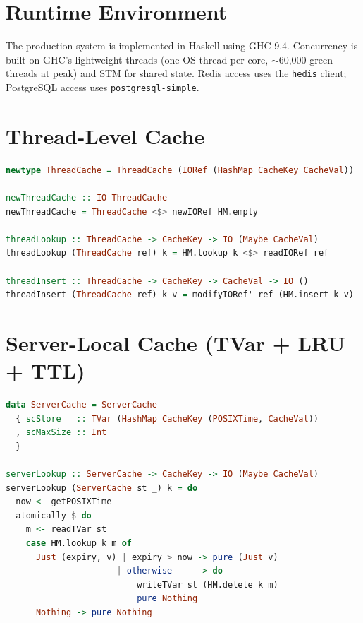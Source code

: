 \section{Runtime Environment}
The production system is implemented in Haskell using GHC 9.4. Concurrency is built on GHC's lightweight threads (one OS thread per core, $\sim$60{,}000 green threads at peak) and STM for shared state. Redis access uses the \texttt{hedis} client; PostgreSQL access uses \texttt{postgresql-simple}.

\section{Thread-Level Cache}
\begin{lstlisting}[language=Haskell, caption=Thread-level cache (request-scoped)]
newtype ThreadCache = ThreadCache (IORef (HashMap CacheKey CacheVal))

newThreadCache :: IO ThreadCache
newThreadCache = ThreadCache <$> newIORef HM.empty

threadLookup :: ThreadCache -> CacheKey -> IO (Maybe CacheVal)
threadLookup (ThreadCache ref) k = HM.lookup k <$> readIORef ref

threadInsert :: ThreadCache -> CacheKey -> CacheVal -> IO ()
threadInsert (ThreadCache ref) k v = modifyIORef' ref (HM.insert k v)
\end{lstlisting}

\section{Server-Local Cache (TVar + LRU + TTL)}
\begin{lstlisting}[language=Haskell, caption=Server-local cache (node-scoped)]
data ServerCache = ServerCache
  { scStore   :: TVar (HashMap CacheKey (POSIXTime, CacheVal))
  , scMaxSize :: Int
  }

serverLookup :: ServerCache -> CacheKey -> IO (Maybe CacheVal)
serverLookup (ServerCache st _) k = do
  now <- getPOSIXTime
  atomically $ do
    m <- readTVar st
    case HM.lookup k m of
      Just (expiry, v) | expiry > now -> pure (Just v)
                      | otherwise     -> do
                          writeTVar st (HM.delete k m)
                          pure Nothing
      Nothing -> pure Nothing
\end{lstlisting}

